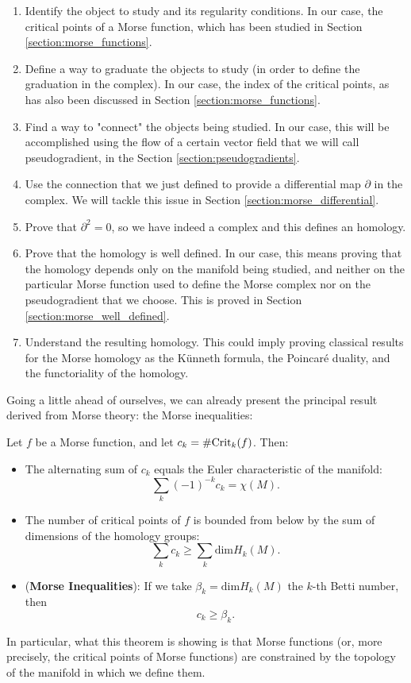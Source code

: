 \begin{enumerate}
\item Identify the object to study and its regularity conditions. In our case, the critical points of a Morse function, which has been studied in Section \ref{section:morse_functions}.
\item Define a way to graduate the objects to study (in order to define the graduation in the complex). In our case, the index of the critical points, as has also been discussed in Section \ref{section:morse_functions}.
\item Find a way to "connect" the objects being studied. In our case, this will be accomplished using the flow of a certain vector field that we will call pseudogradient, in the Section \ref{section:pseudogradients}.
\item Use the connection that we just defined to provide a differential map $\partial$ in the complex. We will tackle this issue in Section \ref{section:morse_differential}.
\item Prove that $\partial^2 = 0$, so we have indeed a complex and this defines an homology.
\item Prove that the homology is well defined. In our case, this means proving that the homology depends only on the manifold being studied, and neither on the particular Morse function used to define the Morse complex nor on the pseudogradient that we choose. This is proved in Section \ref{section:morse_well_defined}.
\item Understand the resulting homology. This could imply proving classical results for the Morse homology as the Künneth formula, the Poincaré duality, and the functoriality of the homology.
\end{enumerate}

Going a little ahead of ourselves, we can already present the principal result derived from Morse theory: the Morse inequalities:

\begin{theo} Let $f$ be a Morse function, and let $c_k = \# \text{Crit}_k(f)$. Then:

\begin{itemize}
	\item The alternating sum of $c_k$ equals the Euler characteristic of the manifold:
	$$\sum_k (-1)^{-k}c_k = \chi(M) .$$
	\item The number of critical points of $f$ is bounded from below by the sum of dimensions of the homology groups:
	$$\sum_k c_k \geq \sum_k \text{dim} H_k(M) .$$
	\item ({\bf Morse Inequalities}): If we take $\beta_k = \text{dim} H_k(M)$ the $k$-th Betti number, then
	$$c_k \geq \beta_k .$$
\end{itemize}
\end{theo}

In particular, what this theorem is showing is that Morse functions (or, more precisely, the critical points of Morse functions) are constrained by the topology of the manifold in which we define them.
